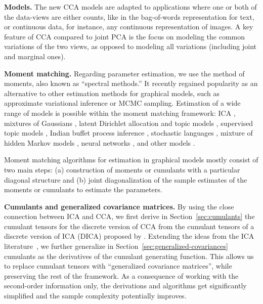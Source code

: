 \documentclass{article}
\newcommand{\ppp}{\textbf}
\begin{document}
\ppp{Models.}
The new CCA models are adapted to applications where one or both of the data-views are either counts, like in the bag-of-words representation for text, or continuous data, for instance, any continuous representation of images. A key feature of CCA compared to joint PCA is the focus on modeling the common variations of the two views, as opposed to modeling all variations (including joint and marginal ones).

\ppp{Moment matching.} Regarding parameter estimation, we use the method of moments, also known as ``spectral methods.'' It recently regained popularity as an alternative to other estimation methods for graphical models, such as approximate variational inference or MCMC sampling. 
Estimation of a wide range of models is possible within the moment matching framework: 
ICA \citep[e.g.,][]{CarCom1996,ComJut2010}, 
mixtures of Gaussians \citep[e.g.,][]{AroKan2005,HsuKak2013}, 
latent Dirichlet allocation and topic models \citep{AroEtAl2012,AroEtAl2013,AnaEtAl2012,PodEtAl2015}, 
supervised topic models \citep{WanZhu2014}, 
Indian buffet process inference \citep{TunSmo2014},
stochastic languages \citep{BalEtAl2014},
mixture of hidden Markov models \citep{SubEtAl2014},  
neural networks   \citep[see, e.g.,][]{AnaSed2015,JanEtAl2016},
and other models \citep[see, e.g.,][and references therein]{AnaEtAl2014}.

Moment matching algorithms for estimation in graphical models mostly consist of two main steps: (a) construction of moments or cumulants with a particular diagonal structure and (b) joint diagonalization of the sample estimates of the moments or cumulants to estimate the parameters. 

\ppp{Cumulants and generalized covariance matrices.} By using the close connection between ICA and CCA, we first derive in Section~\ref{sec:cumulants} the cumulant tensors for the discrete version of CCA from the cumulant tensors of a discrete version of ICA (DICA) proposed by \citet{PodEtAl2015}. Extending the ideas from the ICA literature~\citep{Yer2000,TodHer2013}, we further generalize in Section~\ref{sec:generalized-covariances} cumulants as the derivatives of the cumulant generating function. This allows us to replace cumulant tensors with ``generalized covariance matrices'', while preserving the rest of the framework. As a consequence of working with the second-order information only, the derivations and algorithms get significantly simplified and the sample complexity potentially improves.
\end{document}
